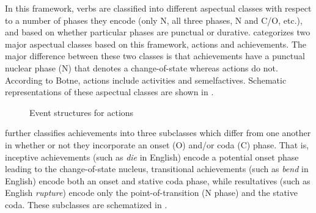 \documentclass[output=paper,newtxmath,modfonts,nonflat,draftmode]{langsci/langscibook}
\begin{document}
In this framework, verbs are classified into different aspectual classes with respect to a number of phases they encode (only N, all three phases, N and C/O, etc.), and based on whether particular phases are punctual or durative. \citet[32--33]{Botne2010} categorizes two major aspectual classes based on this framework, actions and achievements. The major difference between these two classes is that achievements have a punctual nuclear phase (N) that denotes a change-of-state whereas actions do not. According to Botne, actions include  activities and  semelfactives. Schematic representations of these aspectual classes are shown in .

\begin{figure}
\caption{Event structures for actions \citep[33]{Botne2010}}
\label{fig:kanijo:2}
\end{figure}

\citet{Botne2010} further classifies achievements into three subclasses which differ from one another in whether or not they incorporate an onset (O) and/or coda (C) phase. That is, inceptive achievements (such as \textit{die} in English) encode a potential onset phase leading to the change-of-state nucleus, transitional achievements (such as \textit{bend} in English) encode both an onset and stative coda phase, while resultatives (such as English \textit{rupture}) encode only the point-of-transition (N phase) and the stative coda. These subclasses are schematized in .
\end{document}
